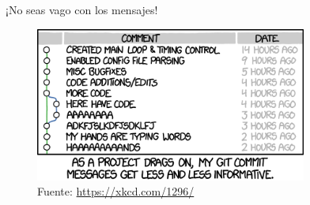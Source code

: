 \begin{frame}[t]{¡No seas vago con los mensajes!}

    \begin{figure}[ht]
        \begin{center}
            \includegraphics[height=2in]{images/xkcd-git-commit.png}
        \end{center}
        \caption{Fuente: \url{https://xkcd.com/1296/}}
    \end{figure}

\end{frame}

